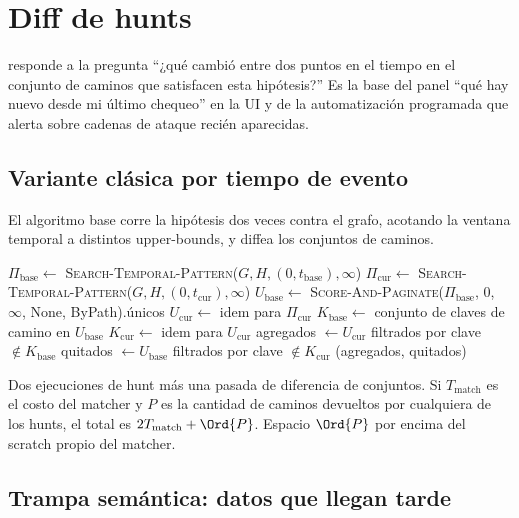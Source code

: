 \chapter{Diff de hunts}
\label{ch:hunt-diff}

 responde a la pregunta ``¿qué cambió entre dos
puntos en el tiempo en el conjunto de caminos que satisfacen
esta hipótesis?'' Es la base del panel ``qué hay nuevo desde mi
último chequeo'' en la UI y de la automatización programada que
alerta sobre cadenas de ataque recién aparecidas.

\section{Variante clásica por tiempo de evento}

El algoritmo base corre la hipótesis dos veces contra el grafo,
acotando la ventana temporal a distintos upper-bounds, y diffea
los conjuntos de caminos.

\begin{algorithm}
\caption{\textsc{Diff-Hunts}}\label{alg:diff-hunts}
$\Pi_{\text{base}} \gets $ \textsc{Search-Temporal-Pattern}($G, H, (0, t_{\text{base}}), \infty$)\;
$\Pi_{\text{cur}} \gets $ \textsc{Search-Temporal-Pattern}($G, H, (0, t_{\text{cur}}), \infty$)\;
$U_{\text{base}} \gets $ \textsc{Score-And-Paginate}($\Pi_{\text{base}}$, 0, $\infty$, None, ByPath).únicos\;
$U_{\text{cur}} \gets $ idem para $\Pi_{\text{cur}}$\;
$K_{\text{base}} \gets $ conjunto de claves de camino en $U_{\text{base}}$\;
$K_{\text{cur}} \gets $ idem para $U_{\text{cur}}$\;
agregados $\gets U_{\text{cur}}$ filtrados por clave $\notin K_{\text{base}}$\;
quitados $\gets U_{\text{base}}$ filtrados por clave $\notin K_{\text{cur}}$\;
\Return (agregados, quitados)\;
\end{algorithm}

\begin{complexity}
Dos ejecuciones de hunt más una pasada de diferencia de
conjuntos. Si $T_{\text{match}}$ es el costo del matcher y $P$ es
la cantidad de caminos devueltos por cualquiera de los hunts, el
total es $2 T_{\text{match}} + \Ord{P}$. Espacio $\Ord{P}$ por
encima del scratch propio del matcher.
\end{complexity}

\section{Trampa semántica: datos que llegan tarde}

